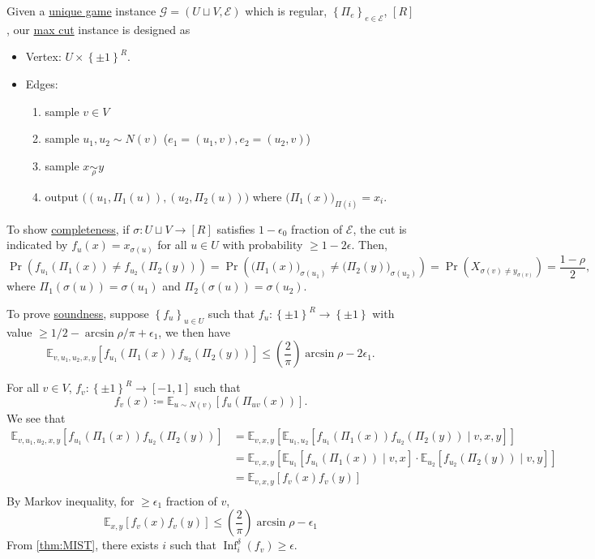 Given a \hyperref[prb:unique-game]{unique game} instance \(\mathcal{G} = (U \sqcup V , \mathcal{E} )\) which is regular, \(\left\{ \Pi _e \right\}_{e\in \mathcal{E} } \), \([R]\), our \hyperref[prb:max-cut]{max cut} instance is designed as
\begin{itemize}
	\item Vertex: \(U \times \left\{ \pm 1 \right\} ^R\).
	\item Edges:
	      \begin{enumerate}
		      \item sample \(v\in V\)
		      \item sample \(u_1, u_2 \sim N(v)\) (\(e_1 = (u_1, v), e_2 = (u_2, v)\))
		      \item sample \(x \underset{\rho }{\sim } y\)
		      \item output \(\big( (u_1, \Pi _1(u)), (u_2, \Pi _2(u))\big)\) where \(\big(\Pi _1(x)\big)_{\Pi (i)} = x_i\).
	      \end{enumerate}
\end{itemize}

To show \hyperref[def:completeness]{completeness}, if \(\sigma \colon U \sqcup V \to [R]\) satisfies \(1 - \epsilon _0\) fraction of \(\mathcal{E} \), the cut is indicated by \(f_u(x) = x_{\sigma (u)}\) for all \(u\in U\) with probability \(\geq 1 - 2 \epsilon \). Then,
\[
	\Pr_{}(f_{u_1}(\Pi _1(x)) \neq f_{u_2}(\Pi _2(y)))
	= \Pr_{}(\big(\Pi _1(x)\big)_{\sigma (u_1)} \neq \big(\Pi _2(y)\big)_{\sigma (u_2)})
	= \Pr_{}(X_{\sigma (v) \neq y_{\sigma (v)}})
	= \frac{1-\rho }{2},
\]
where \(\Pi _1(\sigma (u)) = \sigma (u_1)\) and \(\Pi _2(\sigma (u)) = \sigma (u_2)\).

To prove \hyperref[def:soundness]{soundness}, suppose \(\left\{ f_u \right\} _{u\in U}\) such that \(f_u\colon \left\{ \pm 1 \right\} ^R \to \left\{ \pm 1 \right\} \) with value \(\geq 1 / 2 - \arcsin \rho / \pi + \epsilon _1\), we then have
\[
	\mathbb{E}_{v, u_1, u_2, x, y}\left[f_{u_1}(\Pi _1(x)) f_{u_2}(\Pi _2(y)) \right]
	\leq \left( \frac{2}{\pi } \right) \arcsin \rho - 2\epsilon _1.
\]

For all \(v\in V\), \(f_v \colon \left\{ \pm 1 \right\} ^R \to [-1, 1]\) such that
\[
	f_v(x) \coloneqq \mathbb{E}_{u \sim N(v)}\left[f_u (\Pi _{uv} (x) ) \right].
\]
We see that
\[
	\begin{split}
		\mathbb{E}_{v, u_1, u_2, x, y}\left[f_{u_1}(\Pi _1(x)) f_{u_2}(\Pi _2(y)) \right]
		&= \mathbb{E}_{v, x, y}\left[ \mathbb{E}_{u_1, u_2}\left[ f_{u_1}(\Pi _1(x)) f_{u_2}(\Pi _2(y)) \mid v, x, y\right] \right] \\
		&= \mathbb{E}_{v, x, y}\left[ \mathbb{E}_{u_1}\left[ f_{u_1}(\Pi _1(x)) \mid v, x\right] \cdot \mathbb{E}_{u_2}\left[f_{u_2}(\Pi _2(y)) \mid v, y \right] \right] \\
		&= \mathbb{E}_{v, x, y}\left[ f_v(x) f_v(y) \right] \\
	\end{split}
\]
By Markov inequality, for \(\geq \epsilon _1\) fraction of \(v\),
\[
	\mathbb{E}_{x, y}\left[f_v(x) f_v(y) \right] \leq \left( \frac{2}{\pi } \right) \arcsin \rho - \epsilon _1
\]
From \autoref{thm:MIST}, there exists \(i\) such that \(\mathop{\mathrm{Inf}}_i^\delta (f_v)\geq \epsilon\).

